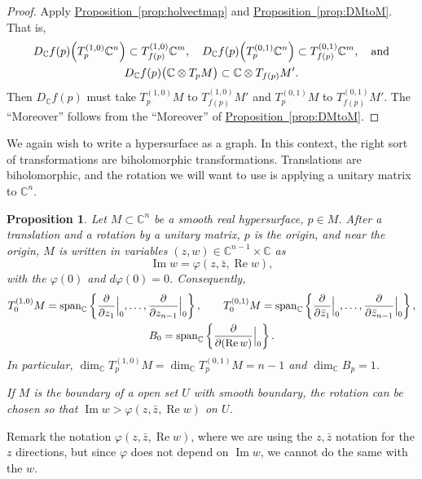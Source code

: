 \documentclass[12pt,openany]{book}
\newcommand{\avoidbreak}{\postdisplaypenalty=100}
\renewcommand{\Re}{\operatorname{Re}}
\renewcommand{\Im}{\operatorname{Im}}
\newcommand{\C}{{\mathbb{C}}}
\theoremstyle{plain}
\newtheorem{prop}[thm]{Proposition}
\theoremstyle{remark}
\theoremstyle{definition}
\theoremstyle{exercise}
\theoremstyle{example}
\newcommand{\propref}[1]{\hyperref[#1]{Proposition~\ref*{#1}}}
\begin{document}
\begin{proof}
Apply \propref{prop:holvectmap} and
\propref{prop:DMtoM}.
That is,
\begin{multline*}
D_\C f(p)\Bigl(T_p^{(1,0)}\C^n\Bigr) \subset T_{f(p)}^{(1,0)}\C^m, \quad
D_\C f(p)\Bigl(T_p^{(0,1)}\C^n\Bigr) \subset T_{f(p)}^{(0,1)}\C^m, \quad
\text{and} \\
D_\C f(p)\bigl(\C \otimes T_pM\bigr) \subset \C \otimes  T_{f(p)}M' .
\avoidbreak
\end{multline*}
Then $D_\C f(p)$ must take
$T_p^{(1,0)}M$ to $T_{f(p)}^{(1,0)}M'$ and
$T_p^{(0,1)}M$ to $T_{f(p)}^{(0,1)}M'$.
The ``Moreover'' follows
from the ``Moreover'' of \propref{prop:DMtoM}.
\end{proof}

We again wish to write a hypersurface as a graph.  In this context, the
right sort of transformations are biholomorphic transformations.
Translations are biholomorphic, and
the rotation we will want to use is applying a unitary matrix to $\C^n$.

\begin{prop} \label{prop:graphcoordinatesCn}
\pagebreak[2]
Let $M \subset \C^n$ be a smooth real hypersurface, $p \in M$.
After a translation and a rotation by a unitary
matrix, $p$ is the origin, and near the origin,
$M$ is written in variables $(z,w) \in \C^{n-1}
\times \C$ as
\begin{equation*}
\Im w = \varphi(z,\bar{z},\Re w) ,
\end{equation*}
with the $\varphi(0)$  and $d\varphi(0) = 0$.  Consequently,
\begin{gather*}
T_0^{(1,0)} M
= \operatorname{span}_{\C} \left\{
\frac{\partial}{\partial z_1}\Big|_0,
\ldots,
\frac{\partial}{\partial z_{n-1}}\Big|_0 \right\} ,
\qquad
T_0^{(0,1)} M
= \operatorname{span}_{\C} \left\{
\frac{\partial}{\partial \bar{z}_1}\Big|_0,
\ldots,
\frac{\partial}{\partial \bar{z}_{n-1}}\Big|_0 \right\} ,
\\
B_0 = \operatorname{span}_{\C} \left\{
\frac{\partial}{\partial (\Re w)}\Big|_0 \right\} .
\avoidbreak
\end{gather*}
In particular,
$\dim_\C T_p^{(1,0)} M = \dim_\C T_p^{(0,1)} M = n-1$ and
$\dim_\C B_p = 1$.

\nopagebreak
If $M$ is the boundary of a open set $U$ with smooth boundary,
the rotation can be chosen so that
$\Im w > \varphi(z,\bar{z},\Re w)$ on $U$.
\end{prop}

Remark the notation $\varphi(z,\bar{z},\Re w)$, where we are using the
$z,\bar{z}$ notation for the $z$ directions, but since $\varphi$ does not
depend on $\Im w$, we cannot do the same with the $w$.
\end{document}

